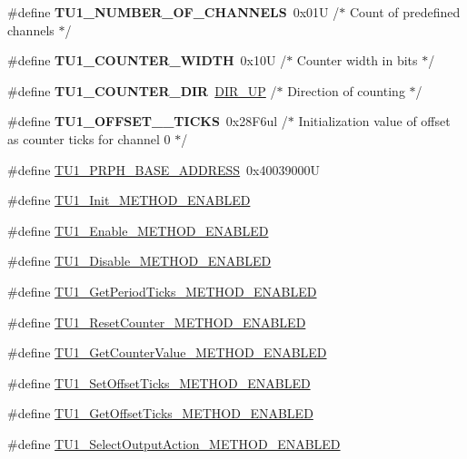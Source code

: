 \begin{DoxyCompactItemize}
\#define {\bfseries T\+U1\+\_\+\+N\+U\+M\+B\+E\+R\+\_\+\+O\+F\+\_\+\+C\+H\+A\+N\+N\+E\+LS}~0x01\+U   /$\ast$ Count of predefined channels $\ast$/
\item 
\mbox{\label{group___t_u1__module_ga1f7080987fb558b36a77447a61d7ec4a}} 
\#define {\bfseries T\+U1\+\_\+\+C\+O\+U\+N\+T\+E\+R\+\_\+\+W\+I\+D\+TH}~0x10\+U       /$\ast$ Counter width in bits  $\ast$/
\item 
\mbox{\label{group___t_u1__module_ga199a6b62d73e2782f77ac6c4f7a5ea41}} 
\#define {\bfseries T\+U1\+\_\+\+C\+O\+U\+N\+T\+E\+R\+\_\+\+D\+IR}~\hyperlink{group___p_e___types__module_gga89181fe4df1c4701239176768b4a9ce5a0b76fb863426c07c6c997a8d9523257b}{D\+I\+R\+\_\+\+UP}      /$\ast$ Direction of counting $\ast$/
\item 
\mbox{\label{group___t_u1__module_gaf2cdea3bc905d8525cfc0022dfe6c4ee}} 
\#define {\bfseries T\+U1\+\_\+\+O\+F\+F\+S\+E\+T\+\_\+\_\+\+T\+I\+C\+KS}~0x28\+F6ul    /$\ast$ Initialization value of offset as \textquotesingle{}counter ticks\textquotesingle{} for channel 0 $\ast$/
\item 
\#define \hyperlink{group___t_u1__module_ga791d7a56f94f745b0dbb9a0ff09ee0d4}{T\+U1\+\_\+\+P\+R\+P\+H\+\_\+\+B\+A\+S\+E\+\_\+\+A\+D\+D\+R\+E\+SS}~0x40039000U
\item 
\#define \hyperlink{group___t_u1__module_ga2532ba47f579738a2f954e79d2d99e9d}{T\+U1\+\_\+\+Init\+\_\+\+M\+E\+T\+H\+O\+D\+\_\+\+E\+N\+A\+B\+L\+ED}
\item 
\#define \hyperlink{group___t_u1__module_ga5ad9e0de1c10fddf5dc67630e02946b0}{T\+U1\+\_\+\+Enable\+\_\+\+M\+E\+T\+H\+O\+D\+\_\+\+E\+N\+A\+B\+L\+ED}
\item 
\#define \hyperlink{group___t_u1__module_ga1064e0a63c9149f572ce33287e9cb656}{T\+U1\+\_\+\+Disable\+\_\+\+M\+E\+T\+H\+O\+D\+\_\+\+E\+N\+A\+B\+L\+ED}
\item 
\#define \hyperlink{group___t_u1__module_gabd70124050f4035fcee63321d7d3a99c}{T\+U1\+\_\+\+Get\+Period\+Ticks\+\_\+\+M\+E\+T\+H\+O\+D\+\_\+\+E\+N\+A\+B\+L\+ED}
\item 
\#define \hyperlink{group___t_u1__module_ga96fb49b417be2f405bf36f8a53fa7317}{T\+U1\+\_\+\+Reset\+Counter\+\_\+\+M\+E\+T\+H\+O\+D\+\_\+\+E\+N\+A\+B\+L\+ED}
\item 
\#define \hyperlink{group___t_u1__module_ga3259d4aea5a2118f1800156dbf7013ce}{T\+U1\+\_\+\+Get\+Counter\+Value\+\_\+\+M\+E\+T\+H\+O\+D\+\_\+\+E\+N\+A\+B\+L\+ED}
\item 
\#define \hyperlink{group___t_u1__module_ga90698898a684132fd97e9dd6196060ae}{T\+U1\+\_\+\+Set\+Offset\+Ticks\+\_\+\+M\+E\+T\+H\+O\+D\+\_\+\+E\+N\+A\+B\+L\+ED}
\item 
\#define \hyperlink{group___t_u1__module_gab9d6c0bb1c02d3702052b98d932f0915}{T\+U1\+\_\+\+Get\+Offset\+Ticks\+\_\+\+M\+E\+T\+H\+O\+D\+\_\+\+E\+N\+A\+B\+L\+ED}
\item 
\#define \hyperlink{group___t_u1__module_ga342afc8257cb609573d8bb4a9904e66b}{T\+U1\+\_\+\+Select\+Output\+Action\+\_\+\+M\+E\+T\+H\+O\+D\+\_\+\+E\+N\+A\+B\+L\+ED}
\end{DoxyCompactItemize}
